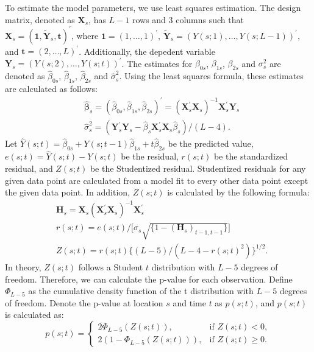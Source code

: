 \documentclass[11pt]{article}
\begin{document}
To estimate the model parameters, we use least squares estimation. The design matrix, denoted as $\bm{X}_s$, has $L-1$ rows and $3$ columns such that $\bm{X}_s=(\mathbf{1}, \tilde{\mathbf{Y}}_s, \mathbf{t})^{\prime}$, where $\mathbf{1}=(1, \ldots, 1)^{\prime}$, $\tilde{\mathbf{Y}}_s=(Y(s;1), \ldots, Y(s;L-1))^{\prime}$, and $\mathbf{t}=(2,\ldots, L)^{\prime}$. Additionally, the depedent variable $\bm{Y}_{s}=(Y(s;2), \ldots, Y(s;t))^{\prime}$. The estimates for $\beta_{0s}$, $\beta_{1s}$, $\beta_{2s}$ and $\sigma_{s}^2$ are denoted as $\hat{\beta}_{0s}$, $\hat{\beta}_{1s}$, $\hat{\beta}_{2s}$ and $\hat{\sigma}_s^2$. Using the least squares formula, these estimates are calculated as follows:
\begin{align}
	&\hat{\bm{\beta}}_s = (\hat{\beta}_{0s}, \hat{\beta}_{1s}, \hat{\beta}_{2s})^{\prime} = (\bm{X}_s^{\prime}\bm{X}_s)^{-1}\bm{X}_s^{\prime}\bm{Y}_s\\
	&\hat{\sigma}_s^2 = (\bm{Y}_s^{\prime}\bm{Y}_s - \hat{\beta}_s\bm{X}_s^{\prime}\bm{X}_s\hat{\beta}_s) / (L-4).
\end{align}
Let $\hat{Y}(s;t)=\hat{\beta}_{0s}+Y(s;t-1)\hat{\beta}_{1s}+t\hat{\beta}_{2s}$ be the predicted value,  $e(s;t)=\hat{Y}(s;t)-Y(s;t)$ be the residual, $r(s;t)$ be the standardized residual, and $Z(s;t)$ be the Studentized residual. Studentized residuals for any given data point are calculated from a model fit to every other data point except the given data point. In addition, $Z(s;t)$ is calculated by the following formula:
\begin{align}
	&\bm{H}_s=\bm{X}_s(\bm{X}_s^{\prime}\bm{X}_s)^{-1}\bm{X}_s^{\prime}\\
	&r(s;t)=e(s;t)/\big[\hat{\sigma}_s\sqrt{\{1-(\bm{H}_s)_{t-1, t-1}\}}\big]\\
	&Z(s;t)=r(s;t)\{(L-5)/(L-4-r(s;t)^2)\}^{1/2}.
\end{align}
In theory, $Z(s;t)$ follows a Student $t$ distribution with $L-5$ degrees of freedom. Therefore, we can calculate the p-value for each observation. Define $\Phi_{L-5}$ as the cumulative density function of the t distribution with $L-5$ degrees of freedom. Denote the p-value at location $s$ and time $t$ as $p(s;t)$, and $p(s;t)$ is calculated as:
\begin{equation}\label{eq: p-value}
    p(s;t) = 
    \begin{cases} 
        2\Phi_{L-5}(Z(s;t)), & \text{if } Z(s;t) < 0, \\
        2(1 - \Phi_{L-5}(Z(s;t))), & \text{if } Z(s;t) \ge 0.
    \end{cases}
\end{equation}
\end{document}

